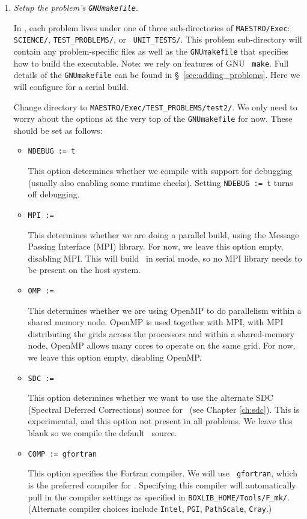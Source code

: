 \begin{enumerate}
\item {\em Setup the problem's {\tt GNUmakefile}}.

In \maestro, each problem lives under one of three sub-directories of
{\tt MAESTRO/Exec}: {\tt SCIENCE/}, {\tt TEST\_PROBLEMS/}, or {\tt
UNIT\_TESTS/}.  This problem sub-directory will contain any
problem-specific files as well as the {\tt GNUmakefile} that specifies
how to build the executable.  Note: we rely on features of GNU {\tt
make}.  Full details of the {\tt GNUmakefile} can be found
in \S~\ref{sec:adding_problems}.  Here we will configure for a serial
build.

Change directory to {\tt MAESTRO/Exec/TEST\_PROBLEMS/test2/}.    
We only need to worry about the options at the very top of the
{\tt GNUmakefile} for now.  These should be set as follows:
\begin{itemize}
\item {\tt NDEBUG := t}

This option determines whether we compile with support for debugging
(usually also enabling some runtime checks).  Setting {\tt NDEBUG := t}
turns off debugging.

\item {\tt MPI := }

This determines whether we are doing a parallel build, using the Message
Passing Interface (MPI) library.  For now, we leave this option empty,
disabling MPI.  This will build \maestro\ in serial mode, so no MPI
library needs to be present on the host system.

\item {\tt OMP := }

This determines whether we are using OpenMP to do parallelism within a
shared memory node.  OpenMP is used together with MPI, with MPI
distributing the grids across the processors and within a
shared-memory node, OpenMP allows many cores to operate on the same
grid.  For now, we leave this option empty, disabling OpenMP.

\item {\tt SDC := }

This option determines whether we want to use the alternate SDC
(Spectral Deferred Corrections) source for \maestro\ (see
Chapter \ref{ch:sdc}).  This is experimental, and this option not present
in all problems.  We leave this blank so we compile the
default \maestro\ source.

\item {\tt COMP := gfortran}

This option specifies the Fortran compiler.  We will use {\tt
gfortran}, which is the preferred compiler for \maestro.  Specifying
this compiler will automatically pull in the compiler settings as
specified in {\tt BOXLIB\_HOME/Tools/F\_mk/}.  (Alternate compiler
choices include {\tt Intel}, {\tt PGI}, {\tt PathScale}, {\tt Cray}.)


\end{itemize}
\end{enumerate}
